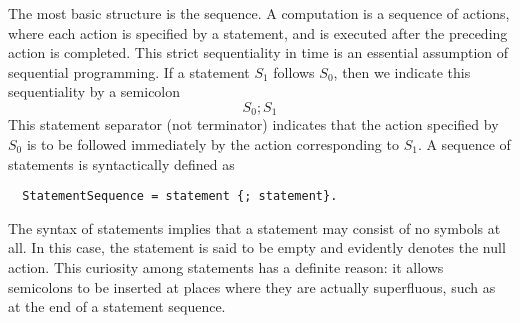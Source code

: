 The most basic structure is the sequence. A computation is a sequence of actions, where each
action is specified by a statement, and is executed after the preceding action is completed. This
strict sequentiality in time is an essential assumption of sequential programming. If a statement
$S_1$ follows $S_0$, then we indicate this sequentiality by a semicolon
\[  S_0; S_1 \]
This statement separator (not terminator) indicates that the action specified by $S_0$ is to be
followed immediately by the action corresponding to $S_1$. A sequence of statements is syntactically
defined as
\begin{verbatim}
  StatementSequence = statement {; statement}.
\end{verbatim}
The syntax of statements implies that a statement may consist of no symbols at all. In this case, the
statement is said to be empty and evidently denotes the null action. This curiosity among statements
has a definite reason: it allows semicolons to be inserted at places where they are actually
superfluous, such as at the end of a statement sequence.
